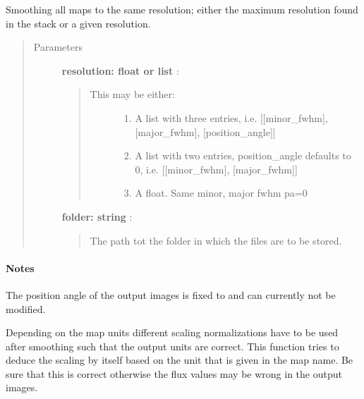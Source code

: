 \documentclass[a4paper,10pt,english]{sphinxmanual}
\begin{document}
\begin{fulllineitems}
\begin{fulllineitems}
\end{fulllineitems}


\begin{fulllineitems}
\label{maps:astrolyze.maps.stack.Stack.unify_resolutions}
Smoothing all maps to the same resolution; either the maximum
resolution found in the stack or a given resolution.
\begin{quote}\begin{description}
\item[{Parameters }] \leavevmode
\textbf{resolution: float or list} :
\begin{quote}
\begin{description}
\item[{This may be either:}] \leavevmode\begin{enumerate}
\item {} 
A list with three entries, i.e.
{[}{[}minor\_fwhm{]}, {[}major\_fwhm{]}, {[}position\_angle{]}{]}

\item {} 
A list with two entries, position\_angle defaults to 0, i.e.
{[}{[}minor\_fwhm{]}, {[}major\_fwhm{]}{]}

\item {} 
A float. Same minor, major fwhm pa=0

\end{enumerate}

\end{description}
\end{quote}

\textbf{folder: string} :
\begin{quote}

The path tot the folder in which the files are to be stored.
\end{quote}

\end{description}\end{quote}
\paragraph{Notes}

The position angle of the output images is fixed to  and can
currently not be modified.

Depending on the map units different scaling normalizations have to be
used after smoothing such that the output units are correct. This
function tries to deduce the scaling by itself based on the unit that
is given in the map name. Be sure that this is correct otherwise the
flux values may be wrong in the output images.


\end{fulllineitems}
\end{fulllineitems}
\end{document}
